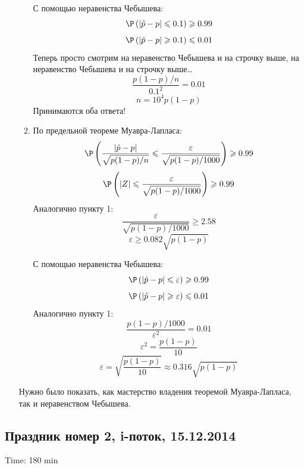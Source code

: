 \begin{enumerate}
\begin{enumerate}
С помощью неравенства Чебышева:
\[ \P \left( |\hat{p} - p| \leqslant 0.1 \right) \geqslant 0.99 \]
\[ \P \left( |\hat{p} - p| \geqslant 0.1 \right) \leqslant 0.01 \]
Теперь просто смотрим на неравенство Чебышева и на строчку выше, на неравенство Чебышева и на строчку выше\ldots
\[ \frac{p(1-p)/n}{0.1^2} = 0.01\]
\[ n = 10^4 p(1-p) \]
Принимаются оба ответа!

\item По предельной теореме Муавра-Лапласа:
\[ \P \left( \frac{|\hat{p} - p|}{\sqrt{p(1-p)/n}} \leqslant \frac{\varepsilon}{\sqrt{p(1-p)/1000}} \right) \geqslant 0.99 \]
\[ \P \left( |Z| \leqslant \frac{\varepsilon}{\sqrt{p(1-p)/1000}} \right) \geqslant 0.99 \]
Аналогично пункту 1:
\[ \frac{\varepsilon}{\sqrt{p(1-p)/1000}} \geqslant 2.58 \]
\[ \varepsilon \geqslant 0.082 \sqrt{p(1-p)} \]

С помощью неравенства Чебышева:
\[ \P \left( |\hat{p} - p| \leqslant \varepsilon \right) \geqslant 0.99 \]
\[ \P \left( |\hat{p} - p| \geqslant \varepsilon \right) \leqslant 0.01 \]
Аналогично пункту 1:
\[ \frac{p(1-p)/1000}{\varepsilon^2} = 0.01\]
\[ \varepsilon^2 = \frac{p(1-p)}{10} \]
\[ \varepsilon = \sqrt{\frac{p(1-p)}{10}} \approx 0.316 \sqrt{p(1-p)} \]

\end{enumerate}

Нужно было показать, как мастерство владения теоремой Муавра-Лапласа, так и неравенством Чебышева.


\end{enumerate}


\subsection{Праздник номер 2, i-поток, 15.12.2014}

Time: 180 min

